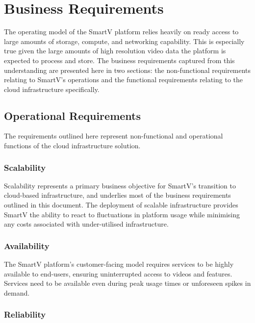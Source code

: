 \section{Business Requirements}

The operating model of the SmartV platform relies heavily on ready access to large amounts of storage, compute, and networking capability. This is especially true given the large amounts of high resolution video data the platform is expected to process and store. The business requirements captured from this understanding are presented here in two sections: the non-functional requirements relating to SmartV's operations and the functional requirements relating to the cloud infrastructure specifically.

\subsection{Operational Requirements}

The requirements outlined here represent non-functional and operational functions of the cloud infrastructure solution.

\subsubsection*{Scalability}

Scalability represents a primary business objective for SmartV's transition to cloud-based infrastructure, and underlies most of the business requirements outlined in this document. The deployment of scalable infrastructure provides SmartV the ability to react to fluctuations in platform usage while minimising any costs associated with under-utilised infrastructure.

\subsubsection*{Availability}

The SmartV platform's customer-facing model requires services to be highly available to end-users, ensuring uninterrupted access to videos and features. Services need to be available even during peak usage times or unforeseen spikes in demand.


\subsubsection*{Reliability}

